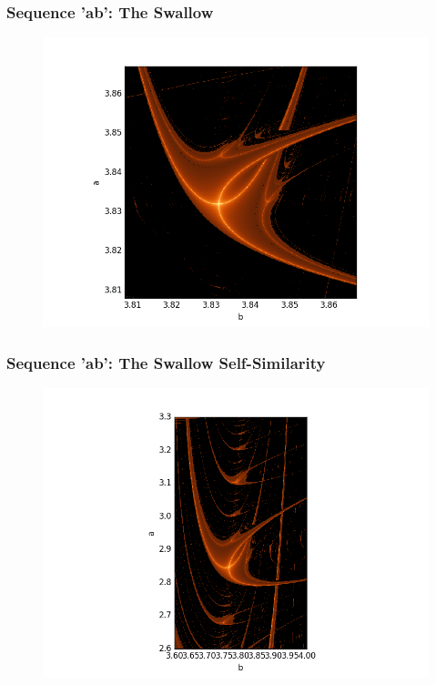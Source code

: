 \documentclass[ignorenonframetext]{beamer}
\begin{document}
\begin{frame}
\frametitle{Sequence 'ab': The Swallow}
\begin{figure}[htbp]
\includegraphics[scale = 0.5]{pictures/The-swallow_ab.png}
\end{figure}
\end{frame}

\begin{frame}
\frametitle{Sequence 'ab': The Swallow Self-Similarity}
\begin{figure}[htbp]
\includegraphics[scale = 0.5]{pictures/The-swallow-ab-self.png}
\end{figure}
\end{frame}
\end{document}
